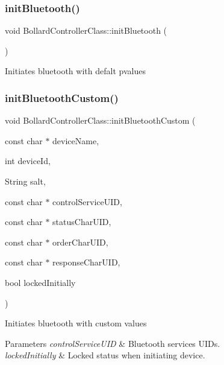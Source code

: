 \subsubsection{\texorpdfstring{init\+Bluetooth()}{initBluetooth()}}
{\footnotesize\ttfamily void Bollard\+Controller\+Class\+::init\+Bluetooth (\begin{DoxyParamCaption}{ }\end{DoxyParamCaption})}

Initiates bluetooth with defalt pvalues \mbox{\label{class_bollard_controller_class_aea92c19b0ccb06e2ddc3adadbe698ebf}} 
\subsubsection{\texorpdfstring{init\+Bluetooth\+Custom()}{initBluetoothCustom()}}
{\footnotesize\ttfamily void Bollard\+Controller\+Class\+::init\+Bluetooth\+Custom (\begin{DoxyParamCaption}\item[{const char $\ast$}]{device\+Name,  }\item[{int}]{device\+Id,  }\item[{String}]{salt,  }\item[{const char $\ast$}]{control\+Service\+U\+ID,  }\item[{const char $\ast$}]{status\+Char\+U\+ID,  }\item[{const char $\ast$}]{order\+Char\+U\+ID,  }\item[{const char $\ast$}]{response\+Char\+U\+ID,  }\item[{bool}]{locked\+Initially }\end{DoxyParamCaption})}

Initiates bluetooth with custom values 
\begin{DoxyParams}{Parameters}
{\em control\+Service\+U\+ID} & Bluetooth services U\+ID\textquotesingle{}s. \\
\hline
{\em locked\+Initially} & Locked status when initiating device. \\
\hline
\end{DoxyParams}
\mbox{\label{class_bollard_controller_class_ab9fd9904294e6b21de58a49b901a5aee}} 
